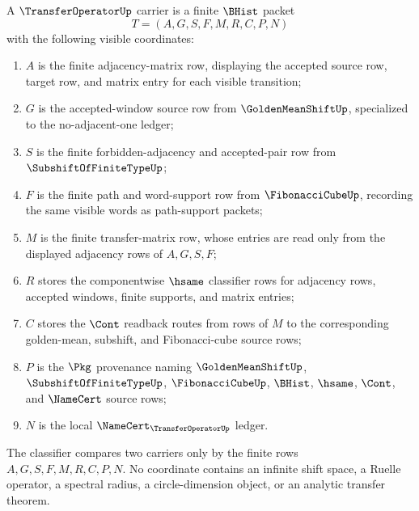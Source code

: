 \begin{definition}
\label{def:transfer-operator-carrier}
A $\TransferOperatorUp$ carrier is a finite $\BHist$ packet
$$
T=(A,G,S,F,M,R,C,P,N)
$$
with the following visible coordinates:
\begin{enumerate}
\item $A$ is the finite adjacency-matrix row, displaying the accepted source row, target row, and matrix entry for each visible transition;
\item $G$ is the accepted-window source row from $\GoldenMeanShiftUp$, specialized to the no-adjacent-one ledger;
\item $S$ is the finite forbidden-adjacency and accepted-pair row from $\SubshiftOfFiniteTypeUp$;
\item $F$ is the finite path and word-support row from $\FibonacciCubeUp$, recording the same visible words as path-support packets;
\item $M$ is the finite transfer-matrix row, whose entries are read only from the displayed adjacency rows of $A,G,S,F$;
\item $R$ stores the componentwise $\hsame$ classifier rows for adjacency rows, accepted windows, finite supports, and matrix entries;
\item $C$ stores the $\Cont$ readback routes from rows of $M$ to the corresponding golden-mean, subshift, and Fibonacci-cube source rows;
\item $P$ is the $\Pkg$ provenance naming $\GoldenMeanShiftUp$, $\SubshiftOfFiniteTypeUp$, $\FibonacciCubeUp$, $\BHist$, $\hsame$, $\Cont$, and $\NameCert$ source rows;
\item $N$ is the local $\NameCert_{\TransferOperatorUp}$ ledger.
\end{enumerate}
The classifier compares two carriers only by the finite rows $A,G,S,F,M,R,C,P,N$. No coordinate contains an infinite shift space, a Ruelle operator, a spectral radius, a circle-dimension object, or an analytic transfer theorem.
\end{definition}

